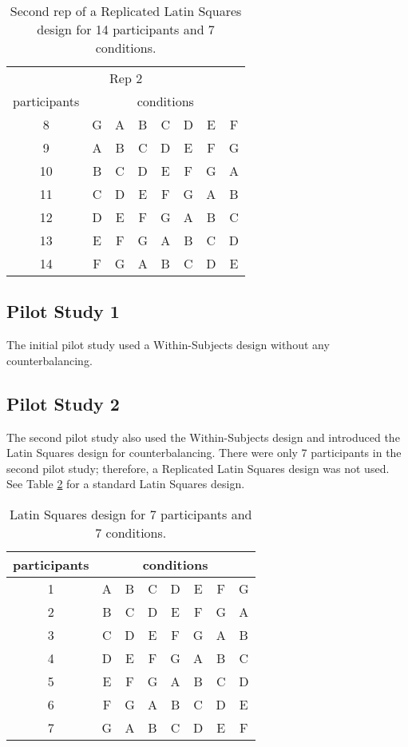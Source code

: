 \begin{table}[h] %
\centering
\caption[Latin Squares Design Rep 2]{\centering Second rep of a Replicated Latin Squares design for 14 participants and 7 conditions.}
\label{table_latin_squares_rep_2}
\begin{tabular}{c | c c c c c c c}
    \hline
    \multicolumn{8}{c}{Rep 2} \\
    participants & \multicolumn{7}{c}{conditions} \\
    \hline
    8 & G & A & B & C & D & E & F \\
    9 & A & B & C & D & E & F & G \\
    10 & B & C & D & E & F & G & A \\
    11 & C & D & E & F & G & A & B \\
    12 & D & E & F & G & A & B & C \\
    13 & E & F & G & A & B & C & D \\
    14 & F & G & A & B & C & D & E \\
    \hline
\end{tabular}
\end{table}

\subsection{Pilot Study 1}

The initial pilot study used a Within-Subjects design without any counterbalancing.

\subsection{Pilot Study 2}

The second pilot study also used the Within-Subjects design and introduced the Latin Squares design for counterbalancing. There were only 7 participants in the second pilot study; therefore, a Replicated Latin Squares design was not used. See Table \ref{table_latin_squares_no_reps} for a standard Latin Squares design.

\begin{table}[h] %
\centering
\caption[Latin Squares Design with No Replications]{\centering Latin Squares design for 7 participants and 7 conditions.}
\label{table_latin_squares_no_reps}
\begin{tabular}{c | c c c c c c c}
    \hline
    participants & \multicolumn{7}{c}{conditions} \\
    \hline
    1 & A & B & C & D & E & F & G \\
    2 & B & C & D & E & F & G & A \\
    3 & C & D & E & F & G & A & B \\
    4 & D & E & F & G & A & B & C \\
    5 & E & F & G & A & B & C & D \\
    6 & F & G & A & B & C & D & E \\
    7 & G & A & B & C & D & E & F \\
    \hline
\end{tabular}
\end{table}